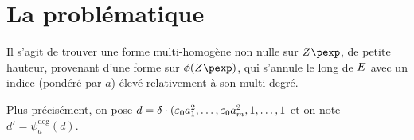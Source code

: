 \documentclass{mpg-preth}
\begin{document}
\section{La problématique}

Il s'agit de trouver une forme multi-homogène non nulle sur $\var$, de petite
hauteur, provenant d'une forme sur $\phi(\var)$, qui s'annule le long de
$E$ avec un indice (pondéré par $a$) élevé relativement à son multi-degré.

Plus précisément, on pose $d = \delta \cdot (\varepsilon_0 a_1^2, \dots, \varepsilon_0
a_m^2, 1, \dots, 1$ et on note $d' = \psi_a^{\deg}(d)$.
\end{document}
